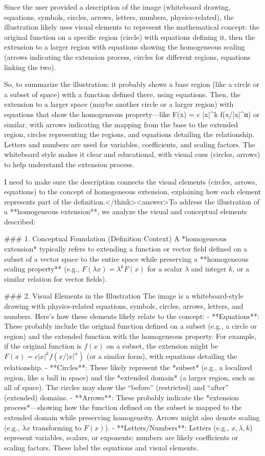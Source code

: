 Since the user provided a description of the image (whiteboard drawing, equations, symbols, circles, arrows, letters, numbers, physics-related), the illustration likely uses visual elements to represent the mathematical concept: the original function on a specific region (circle) with equations defining it, then the extension to a larger region with equations showing the homogeneous scaling (arrows indicating the extension process, circles for different regions, equations linking the two). 

So, to summarize the illustration: it probably shows a base region (like a circle or a subset of space) with a function defined there, using equations. Then, the extension to a larger space (maybe another circle or a larger region) with equations that show the homogeneous property—like F(x) = c |x|^k f(x/|x|^α) or similar, with arrows indicating the mapping from the base to the extended region, circles representing the regions, and equations detailing the relationship. Letters and numbers are used for variables, coefficients, and scaling factors. The whiteboard style makes it clear and educational, with visual cues (circles, arrows) to help understand the extension process. 

I need to make sure the description connects the visual elements (circles, arrows, equations) to the concept of homogeneous extension, explaining how each element represents part of the definition.</think><answer>To address the illustration of a **homogeneous extension**, we analyze the visual and conceptual elements described:  


### 1. Conceptual Foundation (Definition Context)  
A *homogeneous extension* typically refers to extending a function or vector field defined on a subset of a vector space to the entire space while preserving a **homogeneous scaling property** (e.g., \( F(\lambda x) = \lambda^k F(x) \) for a scalar \( \lambda \) and integer \( k \), or a similar relation for vector fields).  


### 2. Visual Elements in the Illustration  
The image is a whiteboard-style drawing with physics-related equations, symbols, circles, arrows, letters, and numbers. Here’s how these elements likely relate to the concept:  
- **Equations**: These probably include the original function defined on a subset (e.g., a circle or region) and the extended function with the homogeneous property. For example, if the original function is \( f(x) \) on a subset, the extension might be \( F(x) = c |x|^k f(x/|x|^{\alpha}) \) (or a similar form), with equations detailing the relationship.  
- **Circles**: These likely represent the *subset* (e.g., a localized region, like a ball in space) and the *extended domain* (a larger region, such as all of space). The circles may show the “before” (restricted) and “after” (extended) domains.  
- **Arrows**: These probably indicate the *extension process*—showing how the function defined on the subset is mapped to the extended domain while preserving homogeneity. Arrows might also denote scaling (e.g., \( \lambda x \) transforming to \( F(x) \)).  
- **Letters/Numbers**: Letters (e.g., \( x, \lambda, k \)) represent variables, scalars, or exponents; numbers are likely coefficients or scaling factors. These label the equations and visual elements.  


